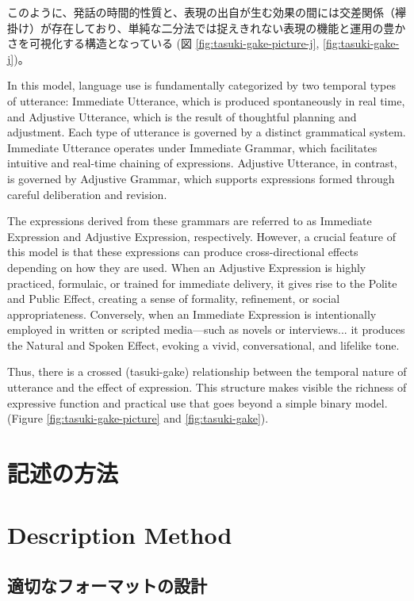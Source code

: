 \documentclass[a4paper,xelatex,ja=standard]{bxjsarticle}
\begin{document}
このように、発話の時間的性質と、表現の出自が生む効果の間には交差関係（襷掛け）が存在しており、単純な二分法では捉えきれない表現の機能と運用の豊かさを可視化する構造となっている
(図 \ref{fig:tasuki-gake-picture-j}, \ref{fig:tasuki-gake-j})。

\else

In this model, language use is fundamentally categorized by two temporal types of utterance:
Immediate Utterance, which is produced spontaneously in real time, and
Adjustive Utterance, which is the result of thoughtful planning and adjustment.
Each type of utterance is governed by a distinct grammatical system.
Immediate Utterance operates under Immediate Grammar, which facilitates intuitive and real-time chaining of expressions.
Adjustive Utterance, in contrast, is governed by Adjustive Grammar, which supports expressions formed through careful deliberation and revision.

The expressions derived from these grammars are referred to as
Immediate Expression and Adjustive Expression, respectively.
However, a crucial feature of this model is that these expressions can produce cross-directional effects depending on how they are used.
When an Adjustive Expression is highly practiced, formulaic, or trained for immediate delivery,
it gives rise to the Polite and Public Effect, creating a sense of formality, refinement, or social appropriateness.
Conversely, when an Immediate Expression is intentionally employed in written or scripted media—such as novels or interviews...
    it produces the Natural and Spoken Effect, evoking a vivid, conversational, and lifelike tone.

Thus, there is a crossed (tasuki-gake) relationship between the temporal nature of utterance and the effect of expression.
This structure makes visible the richness of expressive function and practical use that goes beyond a simple binary model.(Figure \ref{fig:tasuki-gake-picture} and \ref{fig:tasuki-gake}).
\fi

\ifJPN
\section{記述の方法}
\else
\section{Description Method}
\fi

\ifJPN
\subsection{適切なフォーマットの設計}
\else
\end{document}

